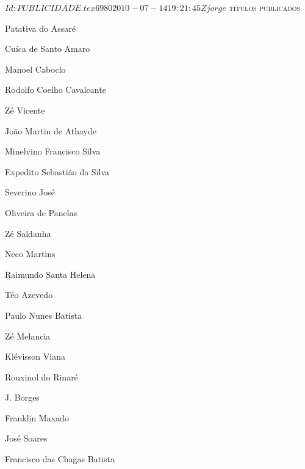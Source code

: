 \SVN $Id: PUBLICIDADE.tex 6980 2010-07-14 19:21:45Z jorge $ 
\pagebreak
\pagestyle{empty}
\textsc{títulos publicados}
\begin{enumerate}
\setlength\itemsep{0.1mm}
{
\def\normalsize{\fontsize{7}{7}\selectfont}\normalsize
\item Patativa do Assaré
\item Cuíca de Santo Amaro
\item Manoel Caboclo
\item Rodolfo Coelho Cavalcante
\item Zé Vicente
\item João Martin de Athayde
\item Minelvino Francisco Silva
\item Expedito Sebastião da Silva
\item Severino José
\item Oliveira de Panelas
\item Zé Saldanha
\item Neco Martins
\item Raimundo Santa Helena
\item Téo Azevedo
\item Paulo Nunes Batista
\item Zé Melancia
\item Klévisson Viana
\item Rouxinol do Rinaré
\item J. Borges
\item Franklin Maxado
\item José Soares
\item Francisco das Chagas Batista
\vfill
}%
\end{enumerate}

